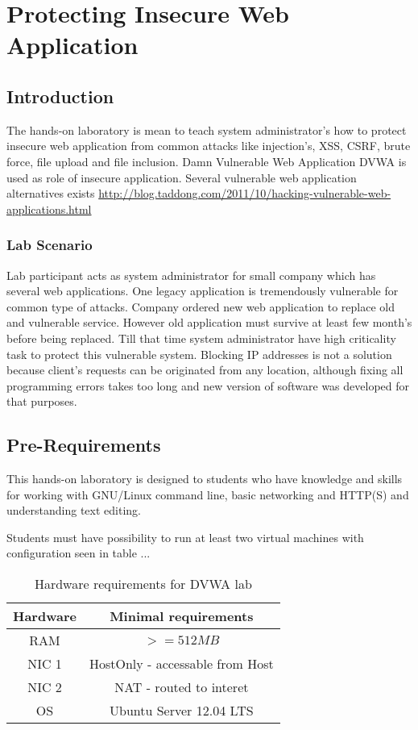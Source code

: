 \chapter{Protecting Insecure Web Application}
\label{Protecting Insecure Web Application}
\section{Introduction}

The hands-on laboratory is mean to teach system administrator's how to protect insecure web application from common attacks like injection's, \gls{XSS}, \gls{CSRF}, brute force, file upload and file inclusion. Damn Vulnerable Web Application \gls{DVWA} is used as role of insecure application. Several vulnerable web application  alternatives exists \url{http://blog.taddong.com/2011/10/hacking-vulnerable-web-applications.html}


\subsection{Lab Scenario}
Lab participant acts as system administrator for small company which has several web applications. One legacy application is tremendously vulnerable for common type of attacks. Company ordered new web application to replace old and vulnerable service. However old application must survive at least few month's before being replaced. Till that time system administrator have high criticality task  to protect this vulnerable system. Blocking IP addresses is not a solution because client's requests can be originated from any location, although fixing all programming errors takes too long and new version of software was developed for that purposes.



\section{Pre-Requirements}
This hands-on laboratory is designed to students who have knowledge and skills for working with GNU/Linux command line, basic networking and HTTP(S) and understanding text editing.
\par
Students must have possibility to run at least two virtual machines with configuration seen in table ...

\begin{table}
\centering
\caption{Hardware requirements for DVWA lab}
\begin{tabular}{|c|c|}
\hline 
\rule[-1ex]{0pt}{2.5ex} Hardware & Minimal requirements \\ 
\hline 
\rule[-1ex]{0pt}{2.5ex} RAM & $>=512MB$ \\ 
\hline 
\rule[-1ex]{0pt}{2.5ex} NIC 1 & HostOnly - accessable from Host \\ 
\hline 
\rule[-1ex]{0pt}{2.5ex} NIC 2 & NAT - routed to interet \\ 
\hline 
\rule[-1ex]{0pt}{2.5ex} OS & Ubuntu Server 12.04 LTS \\ 
\hline 
\end{tabular}
\label{HW for DVWA}
\end{table}


